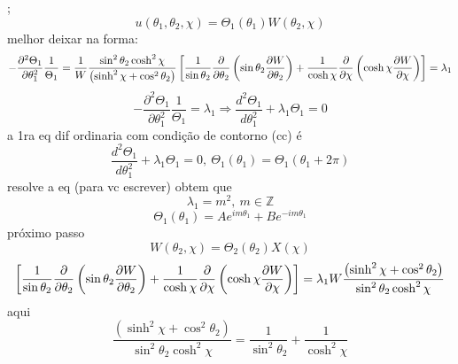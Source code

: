 \documentclass[a4paper,12pt]{article}
\begin{document}
;%
\begin{equation*}
u(\theta _{1},\theta _{2},\chi )=\Theta _{1}(\theta _{1})W(\theta _{2},\chi )
\end{equation*}%
melhor deixar na forma:%
\begin{equation*}
-\frac{\partial ^{2}\Theta _{1}}{\partial \theta _{1}^{2}}\frac{1}{\Theta
_{1}}=\frac{1}{W}\frac{\sin ^{2}\theta _{2}\cosh ^{2}\chi }{\left( \sinh
^{2}\chi +\cos ^{2}\theta _{2}\right) }\left[ \frac{1}{\sin \theta _{2}}%
\frac{\partial }{\partial \theta _{2}}\left( \sin \theta _{2}\frac{\partial W%
}{\partial \theta _{2}}\right) +\frac{1}{\cosh \chi }\frac{\partial }{%
\partial \chi }\left( \cosh \chi \frac{\partial W}{\partial \chi }\right) %
\right] =\lambda _{1}
\end{equation*}%
\begin{equation*}
-\frac{\partial ^{2}\Theta _{1}}{\partial \theta _{1}^{2}}\frac{1}{\Theta
_{1}}=\lambda _{1}\Rightarrow \frac{d^{2}\Theta _{1}}{d\theta _{1}^{2}}%
+\lambda _{1}\Theta _{1}=0
\end{equation*}%
a 1ra eq dif ordinaria com condi\c{c}\~{a}o de contorno (cc) \'{e}%
\begin{equation*}
\frac{d^{2}\Theta _{1}}{d\theta _{1}^{2}}+\lambda _{1}\Theta _{1}=0,\ \Theta
_{1}\left( \theta _{1}\right) =\Theta _{1}\left( \theta _{1}+2\pi \right)
\end{equation*}%
resolve a eq (para vc escrever) obtem que 
\begin{equation*}
\lambda _{1}=m^{2},\ m\in \mathbb{Z}
\end{equation*}%
\begin{equation*}
\Theta _{1}\left( \theta _{1}\right) =Ae^{im\theta _{1}}+Be^{-im\theta _{1}}
\end{equation*}%
pr\'{o}ximo passo%
\begin{equation*}
W(\theta _{2},\chi )=\Theta _{2}(\theta _{2})X(\chi )
\end{equation*}%
\begin{equation*}
\left[ \frac{1}{\sin \theta _{2}}\frac{\partial }{\partial \theta _{2}}%
\left( \sin \theta _{2}\frac{\partial W}{\partial \theta _{2}}\right) +\frac{%
1}{\cosh \chi }\frac{\partial }{\partial \chi }\left( \cosh \chi \frac{%
\partial W}{\partial \chi }\right) \right] =\lambda _{1}W\frac{\left( \sinh
^{2}\chi +\cos ^{2}\theta _{2}\right) }{\sin ^{2}\theta _{2}\cosh ^{2}\chi }
\end{equation*}%
aqui 
\begin{equation*}
\frac{\left( \sinh ^{2}\chi +\cos ^{2}\theta _{2}\right) }{\sin ^{2}\theta
_{2}\cosh ^{2}\chi }=\frac{1}{\sin ^{2}\theta _{2}}+\frac{1}{\cosh ^{2}\chi }
\end{equation*}%
\end{document}
